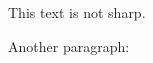 \documentclass{article}
\begin{document}
This text is not sharp. 

Another paragraph:
\end{document}
